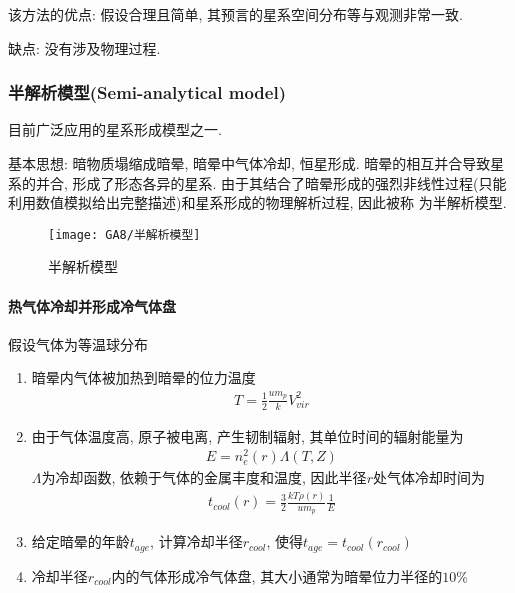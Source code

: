该方法的优点: 假设合理且简单, 其预言的星系空间分布等与观测非常一致. 

缺点: 没有涉及物理过程. 

\subsubsection{半解析模型(Semi-analytical model)}
目前广泛应用的星系形成模型之一. 

基本思想: 暗物质塌缩成暗晕, 暗晕中气体冷却, 恒星形成. 暗晕的相互并合导致星系的并合, 形成了形态各异的星系. 由于其结合了暗晕形成的强烈非线性过程(只能利用数值模拟给出完整描述)和星系形成的物理解析过程, 因此被称
为半解析模型. 

\begin{figure}[!htb]
    \centering
    \texttt{[image: GA8/半解析模型]}
    \caption{半解析模型}
\end{figure}

\paragraph{热气体冷却并形成冷气体盘}
\begin{figure}[!htb]
    \centering
\end{figure}

假设气体为等温球分布
\begin{enumerate}
    \item 暗晕内气体被加热到暗晕的位力温度
    \begin{align*}
        T=\frac{1}{2}\frac{um_p}{k}V_{vir}^2
    \end{align*}
    \item 由于气体温度高, 原子被电离, 产生韧制辐射, 其单位时间的辐射能量为
    \begin{align*}
        E=n_e^2(r)\Lambda(T, Z)
    \end{align*}
    $\Lambda$为冷却函数, 依赖于气体的金属丰度和温度, 因此半径$r$处气体冷却时间为
    \begin{align*}
        t_{cool}(r)=\frac{3}{2}\frac{kT\rho(r)}{um_p}\frac{1}{E}
    \end{align*}
    \item 给定暗晕的年龄$t_{age}$, 计算冷却半径$r_{cool}$, 使得$t_{age}=t_{cool}(r_{cool})$
    \item 冷却半径$r_{cool}$内的气体形成冷气体盘, 其大小通常为暗晕位力半径的$10\%$
\end{enumerate}

